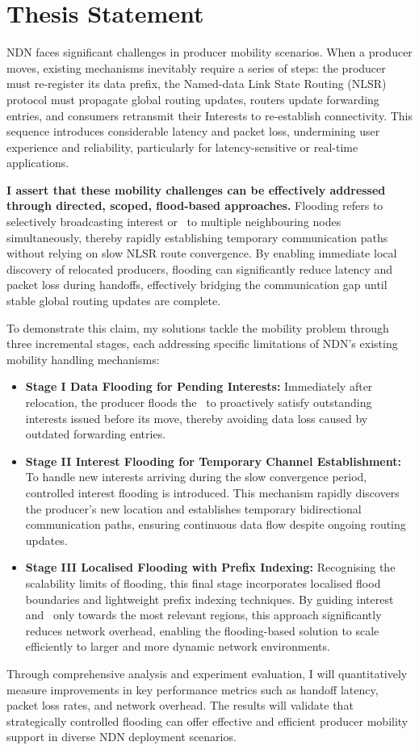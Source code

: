 \section{Thesis Statement}
NDN faces significant challenges in producer mobility scenarios. When a producer moves, existing mechanisms inevitably require a series of steps: the producer must re-register its data prefix, the Named-data Link State Routing (NLSR) protocol must propagate global routing updates, routers update forwarding entries, and consumers retransmit their Interests to re-establish connectivity. This sequence introduces considerable latency and packet loss, undermining user experience and reliability, particularly for latency-sensitive or real-time applications.

\textbf{I assert that these mobility challenges can be effectively addressed through directed, scoped, flood-based approaches.} 
Flooding refers to selectively broadcasting interest or \DataPackets\ to multiple neighbouring nodes simultaneously, thereby rapidly establishing temporary communication paths without relying on slow NLSR route convergence. By enabling immediate local discovery of relocated producers, flooding can significantly reduce latency and packet loss during handoffs, effectively bridging the communication gap until stable global routing updates are complete.

To demonstrate this claim, my solutions tackle the mobility problem through three incremental stages, each addressing specific limitations of NDN's existing mobility handling mechanisms:

\begin{itemize}
    \item \textbf{Stage I Data Flooding for Pending Interests:} Immediately after relocation, the producer floods the \DataPackets\ to proactively satisfy outstanding interests issued before its move, thereby avoiding data loss caused by outdated forwarding entries.
    \item \textbf{Stage II Interest Flooding for Temporary Channel Establishment:} To handle new interests arriving during the slow convergence period, controlled interest flooding is introduced. This mechanism rapidly discovers the producer's new location and establishes temporary bidirectional communication paths, ensuring continuous data flow despite ongoing routing updates.
    \item \textbf{Stage III Localised Flooding with Prefix Indexing:} Recognising the scalability limits of flooding, this final stage incorporates localised flood boundaries and lightweight prefix indexing techniques. By guiding interest and \DataPackets\ only towards the most relevant regions, this approach significantly reduces network overhead, enabling the flooding-based solution to scale efficiently to larger and more dynamic network environments.
\end{itemize}

Through comprehensive analysis and experiment evaluation, I will quantitatively measure improvements in key performance metrics such as handoff latency, packet loss rates, and network overhead. The results will validate that strategically controlled flooding can offer effective and efficient producer mobility support in diverse NDN deployment scenarios.
